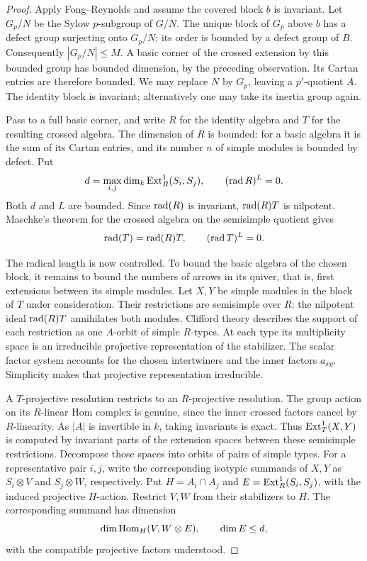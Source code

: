 \begin{proof}
Apply Fong--Reynolds and assume the covered block \(b\) is invariant.
Let \(G_p/N\) be the Sylow \(p\)-subgroup of \(G/N\).  The unique
block of \(G_p\) above \(b\) has a defect group surjecting onto
\(G_p/N\); its order is bounded by a defect group of \(B\).
Consequently \(|G_p/N|\le M\).  A basic corner of the crossed
extension by this bounded group has bounded dimension, by the
preceding observation.  Its Cartan entries are therefore bounded.
We may replace \(N\) by \(G_p\), leaving a \(p'\)-quotient \(A\).
The identity block is invariant; alternatively one may take its
inertia group again.

Pass to a full basic corner, and write \(R\) for the identity
algebra and \(T\) for the resulting crossed algebra.
The dimension of \(R\) is bounded: for a basic algebra it is the
sum of its Cartan entries, and its number \(n\) of simple modules
is bounded by defect.  Put
\[
 d=\max_{i,j}\dim_k\operatorname{Ext}^1_R(S_i,S_j),\qquad
 (\operatorname{rad} R)^L=0.
\]
Both \(d\) and \(L\) are bounded.  Since \(\operatorname{rad}(R)\) is invariant,
\(\operatorname{rad}(R)T\) is nilpotent.  Maschke's theorem for the crossed
algebra on the semisimple quotient gives
\[
 \operatorname{rad}(T)=\operatorname{rad}(R)T,\qquad (\operatorname{rad} T)^L=0.
\]

The radical length is now controlled.  To bound the basic algebra
of the chosen block, it remains to bound the numbers of arrows in
its quiver, that is, first extensions between its simple modules.
Let \(X,Y\) be simple modules in the block of \(T\) under
consideration.  Their restrictions are semisimple over \(R\):
the nilpotent ideal \(\operatorname{rad}(R)T\) annihilates both modules.
Clifford theory describes the support of each restriction as one
\(A\)-orbit of simple \(R\)-types.  At each type its multiplicity
space is an irreducible projective representation of the stabilizer.
The scalar factor system accounts for the chosen intertwiners and
the inner factors \(a_{xy}\).  Simplicity makes that projective
representation irreducible.

A \(T\)-projective resolution restricts to an \(R\)-projective
resolution.  The group action on its \(R\)-linear Hom complex is
genuine, since the inner crossed factors cancel by \(R\)-linearity.
As \(|A|\) is invertible in \(k\), taking invariants is exact.
Thus \(\operatorname{Ext}^1_T(X,Y)\) is computed by invariant parts of the
extension spaces between these semisimple restrictions.
Decompose those spaces into orbits of pairs of simple types.
For a representative pair \(i,j\), write the corresponding
isotypic summands of \(X,Y\) as \(S_i\otimes V\) and
\(S_j\otimes W\), respectively.  Put \(H=A_i\cap A_j\) and
\(E=\operatorname{Ext}^1_R(S_i,S_j)\), with the induced projective
\(H\)-action.  Restrict \(V,W\) from their stabilizers to \(H\).
The corresponding summand has dimension
\[
 \dim\operatorname{Hom}_H(V,W\otimes E),
 \qquad \dim E\le d,
\]
with the compatible projective factors understood.


\end{proof}
